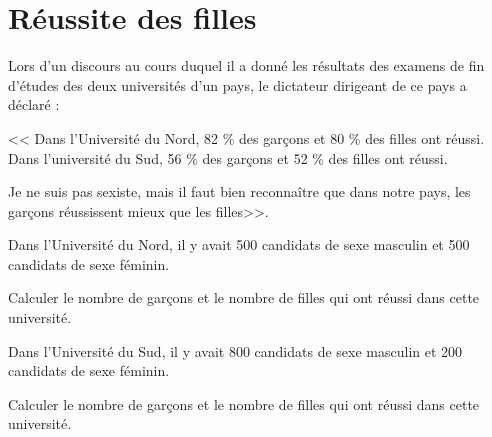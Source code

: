 \section{Réussite des filles}

Lors d'un discours au cours duquel il a donné les résultats des examens de fin d'études des deux universités d'un pays, le dictateur dirigeant de ce pays a déclaré :

<< Dans l'Université du Nord, 82 \% des garçons et 80 \% des filles ont réussi. Dans l'université du Sud, 56 \% des garçons et 52 \% des filles ont réussi.

Je ne suis pas sexiste, mais il faut bien reconnaître que dans notre pays, les garçons réussissent mieux que les filles>>.

\begin{questions}
	\question Dans l'Université du Nord, il y avait 500 candidats de sexe masculin et 500 candidats de sexe féminin.
	
	Calculer le nombre de garçons et le nombre de filles qui ont réussi dans cette université.
	
	\question Dans l'Université du Sud, il y avait 800 candidats de sexe masculin et 200 candidats de sexe féminin.
	
	Calculer le nombre de garçons et le nombre de filles qui ont réussi dans cette université.
	
	\question
\end{questions}
